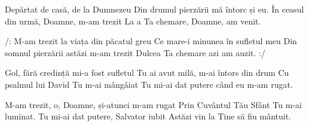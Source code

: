 
\beginverse
Depărtat de casă, de la Dumnezeu
Din drumul pierzării mă întorc și eu.
În ceasul din urmă, Doamne, m-am trezit
La a Ta chemare, Doamne, am venit.
\endverse

\beginchorus
/: M-am trezit la viața din păcatul greu
Ce mare-i minunea în sufletul meu
Din somnul pierzării astăzi m-am trezit
Dulcea Ta chemare azi am auzit. :/
\endchorus

\beginverse
Gol, fără credință mi-a fost sufletul
Tu ai avut milă, m-ai întors din drum
Cu psalmul lui David Tu m-ai mângâiat
Tu mi-ai dat putere când eu m-am rugat.
\endverse

\beginverse
M-am trezit, o, Doamne, și-atunci m-am rugat
Prin Cuvântul Tău Sfânt Tu m-ai luminat.
Tu mi-ai dat putere, Salvator iubit
Astăzi vin la Tine să fiu mântuit.
\endverse

\endsong